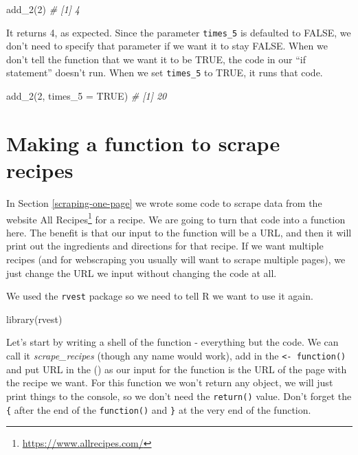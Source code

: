 \documentclass[
]{krantz}
\makeatletter
\newenvironment{Shaded}{\begin{snugshade}}{\end{snugshade}}
\newcommand{\AttributeTok}[1]{\textcolor[rgb]{0.61,0.61,0.61}{#1}}
\newcommand{\CommentTok}[1]{\textcolor[rgb]{0.37,0.37,0.37}{\textit{#1}}}
\newcommand{\ConstantTok}[1]{\textcolor[rgb]{0,0,0}{#1}}
\newcommand{\DecValTok}[1]{\textcolor[rgb]{0.06,0.06,0.06}{#1}}
\newcommand{\FunctionTok}[1]{\textcolor[rgb]{0,0,0}{#1}}
\newcommand{\NormalTok}[1]{#1}
\renewcommand{\href}[2]{#2\footnote{\url{#1}}}
\newenvironment{kframe}{%
\medskip{}
\setlength{\fboxsep}{.8em}
 \def\at@end@of@kframe{}%
 \ifinner\ifhmode%
  \def\at@end@of@kframe{\end{minipage}}%
  \begin{minipage}{\columnwidth}%
 \fi\fi%
 \def\FrameCommand##1{\hskip\@totalleftmargin \hskip-\fboxsep
 \colorbox{shadecolor}{##1}\hskip-\fboxsep
     \hskip-\linewidth \hskip-\@totalleftmargin \hskip\columnwidth}%
 \MakeFramed {\advance\hsize-\width
   \@totalleftmargin\z@ \linewidth\hsize
   \@setminipage}}%
 {\par\unskip\endMakeFramed%
 \at@end@of@kframe}
\renewenvironment{Shaded}{\begin{kframe}}{\end{kframe}}
\makeatother
\begin{document}
\begin{Shaded}
\begin{Highlighting}[]
\FunctionTok{add\_2}\NormalTok{(}\DecValTok{2}\NormalTok{)}
\CommentTok{\# [1] 4}
\end{Highlighting}
\end{Shaded}

It returns 4, as expected. Since the parameter
\texttt{times\_5} is defaulted to FALSE, we don't need to
specify that parameter if we want it to stay FALSE. When we
don't tell the function that we want it to be TRUE, the code
in our ``if statement'' doesn't run. When we set
\texttt{times\_5} to TRUE, it runs that code.

\begin{Shaded}
\begin{Highlighting}[]
\FunctionTok{add\_2}\NormalTok{(}\DecValTok{2}\NormalTok{, }\AttributeTok{times\_5 =} \ConstantTok{TRUE}\NormalTok{)}
\CommentTok{\# [1] 20}
\end{Highlighting}
\end{Shaded}

\hypertarget{recipes-function}{%
\section{Making a function to scrape
recipes}\label{recipes-function}}

In Section \ref{scraping-one-page} we wrote some code to
scrape data from the website
\href{https://www.allrecipes.com/}{All Recipes} for a
recipe. We are going to turn that code into a function here.
The benefit is that our input to the function will be a URL,
and then it will print out the ingredients and directions
for that recipe. If we want multiple recipes (and for
webscraping you usually will want to scrape multiple pages),
we just change the URL we input without changing the code at
all.

We used the \texttt{rvest} package so we need to tell R we
want to use it again.

\begin{Shaded}
\begin{Highlighting}[]
\FunctionTok{library}\NormalTok{(rvest)}
\end{Highlighting}
\end{Shaded}

Let's start by writing a shell of the function - everything
but the code. We can call it \emph{scrape\_recipes} (though
any name would work), add in the
\texttt{\textless{}-\ function()} and put URL in the () as
our input for the function is the URL of the page with the
recipe we want. For this function we won't return any
object, we will just print things to the console, so we
don't need the \texttt{return()} value. Don't forget the
\texttt{\{} after the end of the \texttt{function()} and
\texttt{\}} at the very end of the function.
\end{document}
